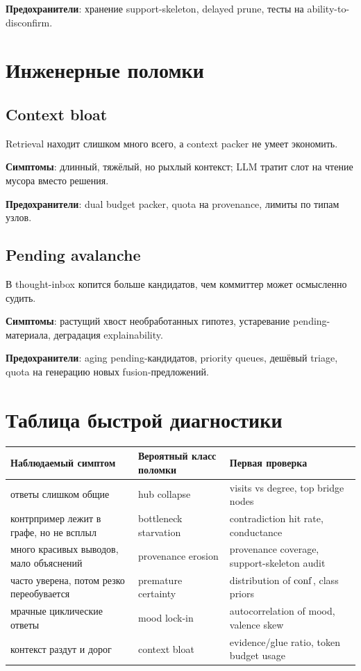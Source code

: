 \textbf{Предохранители}: хранение support-skeleton, delayed prune, тесты на
ability-to-disconfirm.

\section{Инженерные поломки}

\subsection*{Context bloat}
Retrieval находит слишком много всего, а context packer не умеет экономить.

\textbf{Симптомы}: длинный, тяжёлый, но рыхлый контекст; LLM тратит слот на чтение
мусора вместо решения.

\textbf{Предохранители}: dual budget packer, quota на provenance, лимиты по типам узлов.

\subsection*{Pending avalanche}
В thought-inbox копится больше кандидатов, чем коммиттер может осмысленно судить.

\textbf{Симптомы}: растущий хвост необработанных гипотез, устаревание pending-материала,
деградация explainability.

\textbf{Предохранители}: aging pending-кандидатов, priority queues, дешёвый triage,
quota на генерацию новых fusion-предложений.

\section{Таблица быстрой диагностики}

\begin{center}
\begin{tabular}{p{} p{} p{}}
\toprule
\textbf{Наблюдаемый симптом} & \textbf{Вероятный класс поломки} & \textbf{Первая проверка} \\
\midrule
ответы слишком общие & hub collapse & visits vs degree, top bridge nodes \\
контрпример лежит в графе, но не всплыл & bottleneck starvation & contradiction hit rate, conductance \\
много красивых выводов, мало объяснений & provenance erosion & provenance coverage, support-skeleton audit \\
часто уверена, потом резко переобувается & premature certainty & distribution of $\mathrm{conf}$, class priors \\
мрачные циклические ответы & mood lock-in & autocorrelation of mood, valence skew \\
контекст раздут и дорог & context bloat & evidence/glue ratio, token budget usage \\
\bottomrule
\end{tabular}
\end{center}

